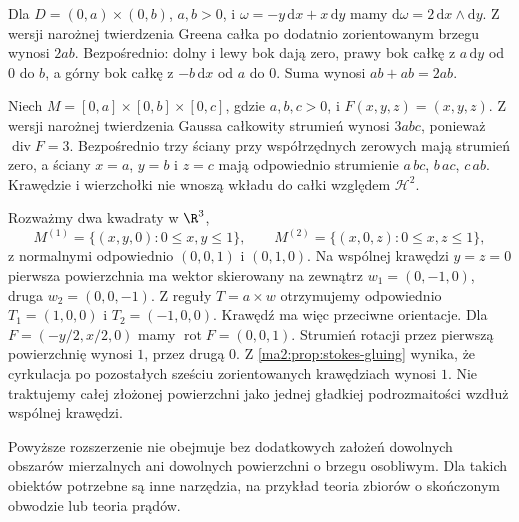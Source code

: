 \begin{przyklad}
\label{ma2:ex:green-rectangle}
Dla $D=(0,a)\times(0,b)$, $a,b>0$,
i $\omega=-y\,\mathrm dx+x\,\mathrm dy$
mamy $\mathrm d\omega=2\,\mathrm dx\wedge\mathrm dy$.
Z wersji narożnej twierdzenia Greena
całka po dodatnio zorientowanym brzegu
wynosi $2ab$. Bezpośrednio: dolny i lewy bok
dają zero, prawy bok całkę z $a\,\mathrm dy$
od $0$ do $b$, a górny bok całkę z
$-b\,\mathrm dx$ od $a$ do $0$.
Suma wynosi $ab+ab=2ab$.
\end{przyklad}

\begin{przyklad}
\label{ma2:ex:gauss-box}
Niech $M=[0,a]\times[0,b]\times[0,c]$,
gdzie $a,b,c>0$, i $F(x,y,z)=(x,y,z)$.
Z wersji narożnej twierdzenia Gaussa
całkowity strumień wynosi $3abc$,
ponieważ $\operatorname{div}F=3$.
Bezpośrednio trzy ściany przy współrzędnych
zerowych mają strumień zero, a ściany
$x=a$, $y=b$ i $z=c$ mają odpowiednio
strumienie $a\,bc$, $b\,ac$, $c\,ab$.
Krawędzie i wierzchołki nie wnoszą wkładu
do całki względem $\mathcal H^2$.
\end{przyklad}

\begin{przyklad}
\label{ma2:ex:stokes-folded}
Rozważmy dwa kwadraty w $\R^3$,
\[
 M^{(1)}=\{(x,y,0):0\le x,y\le1\},\qquad
 M^{(2)}=\{(x,0,z):0\le x,z\le1\},
\]
z normalnymi odpowiednio $(0,0,1)$ i $(0,1,0)$.
Na wspólnej krawędzi $y=z=0$ pierwsza
powierzchnia ma wektor skierowany na zewnątrz
$w_1=(0,-1,0)$, druga $w_2=(0,0,-1)$.
Z reguły $T=a\times w$ otrzymujemy
odpowiednio $T_1=(1,0,0)$ i $T_2=(-1,0,0)$.
Krawędź ma więc przeciwne orientacje.
Dla $F=(-y/2,x/2,0)$ mamy
$\operatorname{rot}F=(0,0,1)$.
Strumień rotacji przez pierwszą powierzchnię
wynosi $1$, przez drugą $0$.
Z \ref{ma2:prop:stokes-gluing} wynika,
że cyrkulacja po pozostałych sześciu
zorientowanych krawędziach wynosi $1$.
Nie traktujemy całej złożonej powierzchni
jako jednej gładkiej podrozmaitości wzdłuż
wspólnej krawędzi.
\end{przyklad}

Powyższe rozszerzenie nie obejmuje bez dodatkowych
założeń dowolnych obszarów mierzalnych ani
dowolnych powierzchni o brzegu osobliwym.
Dla takich obiektów potrzebne są inne narzędzia,
na przykład teoria zbiorów o skończonym obwodzie
lub teoria prądów.
